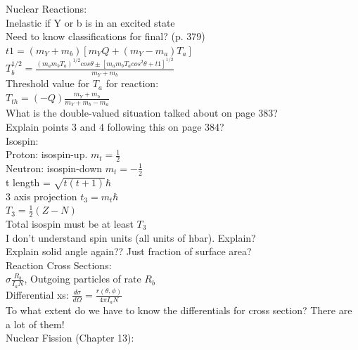 \documentclass{article}
\begin{document}
\begin{multicols}{3}
Nuclear Reactions:\\
Inelastic if Y or b is in an excited state\\
Need to know classifications for final? (p. 379)\\
$t1 =  (m_{Y}+m_{b})[m_{Y}Q + (m_{Y}-m_{a})T_{a}]$
$T_{b}^{1/2} = \frac{(m_{a}m_{b}T_{a})^{1/2}cos\theta \pm [ m_{a}m_{b}T_{a}cos^{2}\theta + t1 ]^{1/2}}{m_{Y} + m_{b}}$\\
Threshold value for $T_{a}$ for reaction:\\
\hspace*{0.01\textwidth} $T_{th} = (-Q)\frac{m_{Y} + m_{b}}{m_{Y}+m_{b}-m_{a}}$\\
What is the double-valued situation talked about on page 383?\\
Explain points 3 and 4 following this on page 384?\\
Isospin:\\
\hspace*{0.01\textwidth} Proton: isospin-up. $m_{t} = \frac{1}{2}$\\
\hspace*{0.01\textwidth} Neutron: isospin-down $m_{t} = -\frac{1}{2}$\\
\hspace*{0.01\textwidth} t length = $\sqrt{t(t+1)}\hbar$\\
\hspace*{0.01\textwidth} 3 axis projection $t_{3} = m_{t}\hbar$\\
\hspace*{0.01\textwidth} $T_{3} = \frac{1}{2} (Z-N)$\\
\hspace*{0.01\textwidth} Total isospin must be at least $T_{3}$\\
I don't understand spin units (all units of hbar).  Explain?\\
Explain solid angle again?? Just fraction of surface area?\\

Reaction Cross Sections:\\
$\sigma \frac{R_{b}}{I_{a}N}$, Outgoing particles of rate $R_{b}$\\
Differential xs: $\frac{d\sigma}{d\Omega} = \frac{r(\theta,\phi)}{4\pi I_{a} N}$\\
To what extent do we have to know the differentials for cross section?  There are a lot of them!\\


Nuclear Fission (Chapter 13):\\


\end{multicols}
\end{document}
